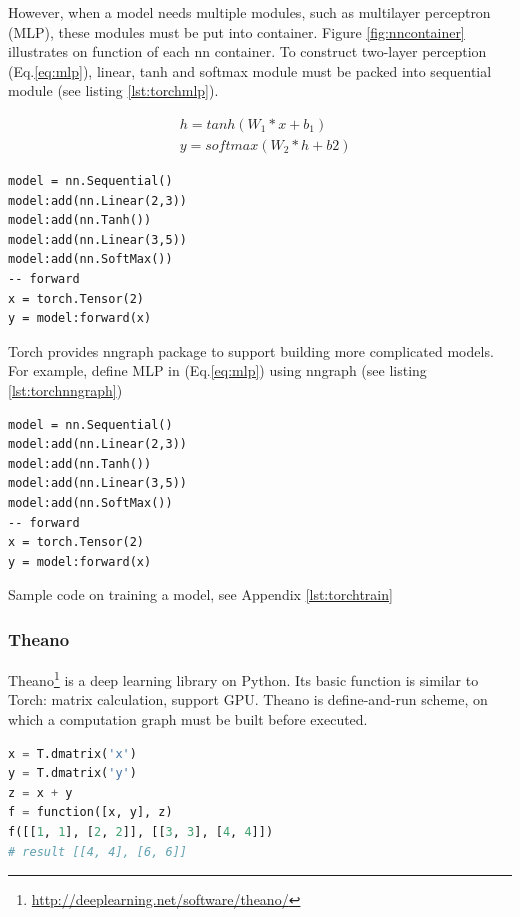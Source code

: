 However, when a model needs multiple modules, such as multilayer perceptron (MLP), these modules must be put into container. Figure \ref{fig:nncontainer} illustrates on function of each nn container. To construct two-layer perception (Eq.\ref{eq:mlp}), linear, tanh and softmax module must be packed into sequential module (see listing \ref{lst:torchmlp}).

\begin{equation}
\label{eq:mlp}
\begin{aligned}
&h = tanh(W_1*x + b_1) \\
&y = softmax(W_2*h + b2)
\end{aligned}
\end{equation}


\begin{lstlisting}[caption={MLP in Torch},label={lst:torchmlp}, language={[5.1]Lua}]
model = nn.Sequential()
model:add(nn.Linear(2,3))
model:add(nn.Tanh())
model:add(nn.Linear(3,5))
model:add(nn.SoftMax())
-- forward
x = torch.Tensor(2)
y = model:forward(x)
\end{lstlisting}

Torch provides nngraph package to support building more complicated models. For example, define MLP in (Eq.\ref{eq:mlp}) using nngraph (see listing \ref{lst:torchnngraph})

\begin{lstlisting}[caption={MLP using nngraph},label={lst:torchnngraph}, language={[5.1]Lua}]
model = nn.Sequential()
model:add(nn.Linear(2,3))
model:add(nn.Tanh())
model:add(nn.Linear(3,5))
model:add(nn.SoftMax())
-- forward
x = torch.Tensor(2)
y = model:forward(x)
\end{lstlisting}

Sample code on training a model, see Appendix \ref{lst:torchtrain}

\subsubsection{Theano}
Theano\footnote{\url{http://deeplearning.net/software/theano/}} is a deep learning library on Python. Its basic function is similar to Torch: matrix calculation, support GPU. Theano is define-and-run scheme, on which a computation graph must be built before executed.

\begin{lstlisting}[caption={Define function in Theano},label={lst:theanof}, language={python}]
x = T.dmatrix('x')
y = T.dmatrix('y')
z = x + y
f = function([x, y], z)
f([[1, 1], [2, 2]], [[3, 3], [4, 4]])
# result [[4, 4], [6, 6]]
\end{lstlisting}

